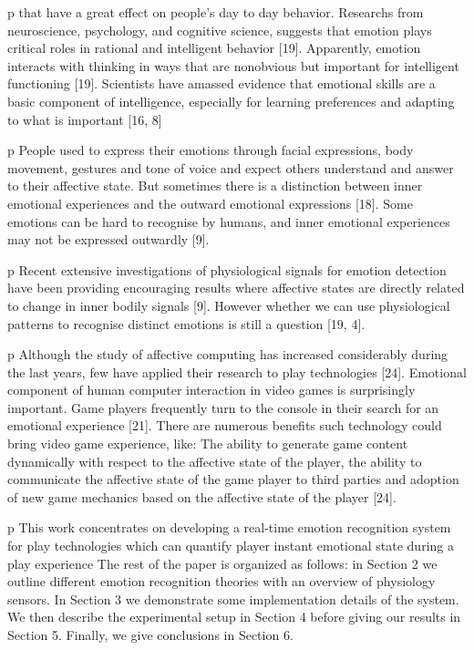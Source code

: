 \documentclass[conference]{include/IEEEtran}
\begin{document}
p that have a great effect on people’s day to day behavior. Researchs from neuroscience, psychology, and cognitive science, suggests that emotion plays critical roles in rational and intelligent behavior [19]. Apparently, emotion interacts with thinking in ways that are nonobvious but important for intelligent functioning [19]. Scientists have amassed evidence that emotional skills are a basic component of intelligence, especially for learning preferences and adapting to what is important [16, 8]

p People used to express their emotions through facial expressions, body movement, gestures and tone of voice and expect others understand and answer to their affective state. But sometimes there is a distinction between inner emotional experiences and the outward emotional expressions [18]. Some emotions can be hard to recognise by humans, and inner emotional experiences may not be expressed outwardly [9].

p Recent extensive investigations of physiological signals for emotion detection have been providing encouraging results where affective states are directly related to change in inner bodily signals [9]. However whether we can use physiological patterns to recognise distinct emotions is still a question [19, 4].

p Although the study of affective computing has increased considerably during the last years, few have applied their research to play technologies [24]. Emotional component of human computer interaction in video games is surprisingly important. Game players frequently turn to the console in their search for an emotional experience [21]. There are numerous beneﬁts such technology could bring video game experience, like: The ability to generate game content dynamically with respect to the affective state of the player, the ability to communicate the affective state of the game player to third parties and adoption of new game mechanics based on the affective state of the player [24].

p This work concentrates on developing a real-time emotion recognition system for play technologies which can quantify player instant emotional state during a play experience The rest of the paper is organized as follows: in Section 2 we outline different emotion recognition theories with an overview of physiology sensors. In Section 3 we demonstrate some implementation details of the system. We then describe the experimental setup in Section 4 before giving our results in Section 5. Finally, we give conclusions in Section 6.
\end{document}
